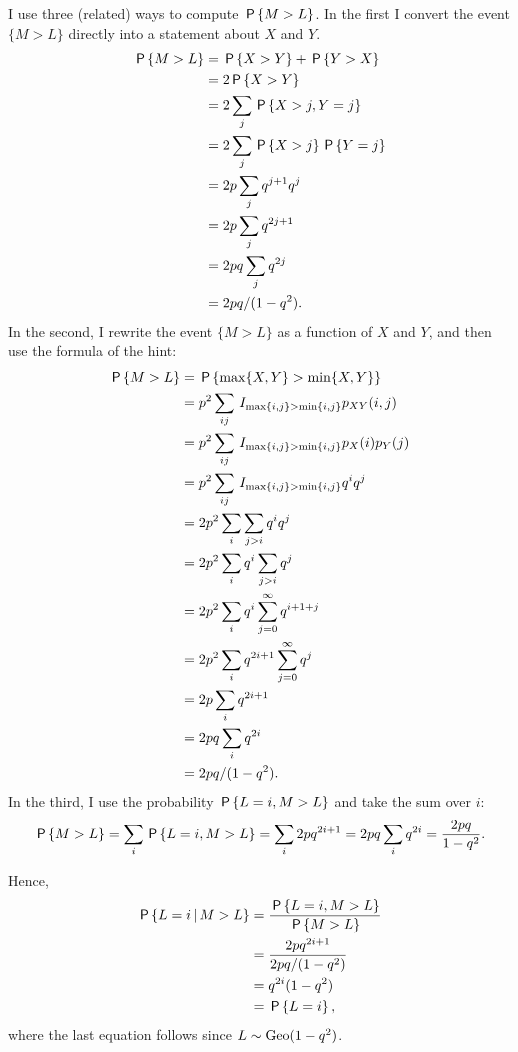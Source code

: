\documentclass[a4paper,11pt]{article}
\renewcommand{\max}[1]{\mathrm{max}\{#1\}}
\renewcommand{\min}[1]{\mathrm{min}\{#1\}}
\begin{document}
\begin{exercise}
\begin{solution}
I use three (related) ways to compute $\P{M>L}$. In the first I convert the event $\{M>L\}$ directly into a statement about $X$ and $Y$.
\begin{align}
  \label{eq:3}
\P{M>L}
&= \P{X>Y} + \P{Y > X} \\
&= 2\P{X>Y} \\
&= 2\sum_{j} \P{X>j,Y=j} \\
&= 2\sum_{j}  \P{X>j}\P{Y=j} \\
&= 2p\sum_{j} q^{j+1} q^j\\
&= 2p\sum_{j} q^{2j+1}\\
&= 2pq\sum_{j} q^{2j}\\
&= 2pq/(1-q^2).
\end{align}
In the second,  I rewrite the event $\{M>L\}$ as a function of $X$ and $Y$, and then use  the formula of the hint:
\begin{align}
  \label{eq:4}
\P{M>L}  &= \P{\max{X, Y} > \min{X,Y}} \\
&=p^2\sum_{ij}\1{\max{i, j} > \min{i, j}} p_{XY}(i,j) \\
&=p^2\sum_{ij}\1{\max{i, j} > \min{i, j}} p_{X}(i)p_{Y}(j) \\
&=p^2\sum_{ij}\1{\max{i, j} > \min{i, j}} q^i q^j \\
&=2p^2\sum_{i}\sum_{j>i} q^i q^j \\
&=2p^2\sum_{i}q^i \sum_{j>i} q^j \\
&=2p^2\sum_{i}q^i \sum_{j=0}^\infty q^{i+1+j} \\
&=2p^2\sum_{i}q^{2i+1} \sum_{j=0}^\infty q^{j} \\
&=2p\sum_{i}q^{2i+1} \\
&=2pq\sum_{i}q^{2i} \\
&=2pq/(1-q^2).
\end{align}
In the third, I use the probability $\P{L=i, M>L}$ and take the sum over $i$:
\begin{align}
  \label{eq:48}
\P{M>L} = \sum_{i} \P{L=i, M>L}  = \sum_{i} 2pq^{2i+1} = 2pq\sum_{i} q^{2i} = \frac{2pq}{1-q^{2}}.
\end{align}

Hence,
\begin{align}
\P{L=i\given M > L}
&=\frac{\P{L=i, M > L}}{\P{M>L}} \\
&=\frac{2p q^{2i+1}}{2pq/(1-q^2)} \\
&=q^{2i}(1-q^2) \\
&= \P{L=i},
\end{align}
where the last equation follows since $L\sim \Geo{1-q^2}$.

\end{solution}
\end{exercise}
\end{document}
